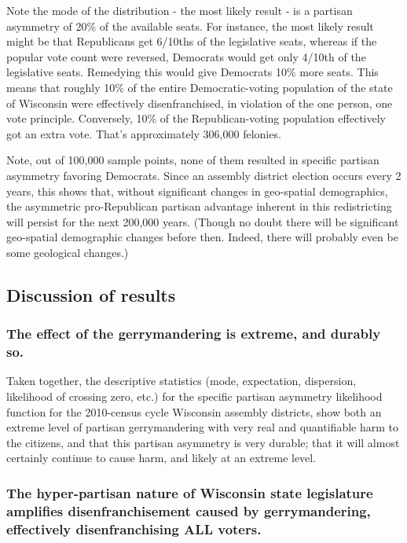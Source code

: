 \documentclass[preprint,12pt]{article}
\begin{document}
Note the mode of the distribution - the most likely result - is a partisan asymmetry of 20\% of the available seats.  For instance, the most likely result might be that Republicans get 6/10ths of the legislative seats, whereas if the popular vote count were reversed, Democrats would get only 4/10th of the legislative seats.  Remedying this would give Democrats 10\% more seats.  This means that roughly 10\% of the entire Democratic-voting population of the state of Wisconsin were effectively disenfranchised, in violation of the one person, one vote principle.  Conversely, 10\% of the Republican-voting population effectively got an extra vote.  That's approximately 306,000 felonies.
 
Note, out of 100,000 sample points, none of them resulted in specific partisan asymmetry favoring Democrats.  Since an assembly district election occurs every 2 years, this shows that, without significant changes in geo-spatial demographics, the asymmetric pro-Republican partisan advantage inherent in this redistricting will persist for the next 200,000 years.  (Though no doubt there will be significant geo-spatial demographic changes before then.  Indeed, there will probably even be some geological changes.)

\subsection{Discussion of results}
\subsubsection{The effect of the gerrymandering is extreme, and durably so.}
 
Taken together, the descriptive statistics (mode, expectation, dispersion, likelihood of crossing zero, etc.) for the specific partisan asymmetry likelihood function for the 2010-census cycle Wisconsin assembly districts, show both an extreme level of partisan gerrymandering with very real and quantifiable harm to the citizens, and that this partisan asymmetry is very durable; that it will almost certainly continue to cause harm, and likely at an extreme level.
 
\subsubsection{The hyper-partisan nature of Wisconsin state legislature amplifies disenfranchisement caused by gerrymandering, effectively disenfranchising ALL voters.}
 
\end{document}

